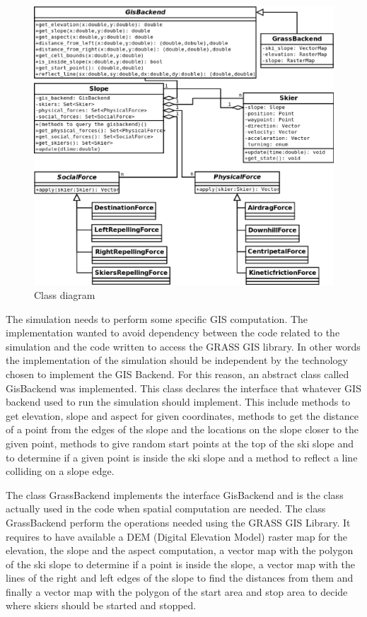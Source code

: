 \documentclass[12pt,a4paper,twoside]{book}
\begin{document}
\begin{figure}[!ht]
  \begin{center}
    \includegraphics[width=\textwidth]{images/Class_diagram.eps}
    \caption{Class diagram}\label{class_diagram}
  \end{center}
\end{figure}

The simulation needs to perform some specific GIS computation. The implementation wanted to avoid dependency between the code related to the simulation and the code written to access the GRASS GIS library. In other words the implementation of the simulation should be independent by the technology chosen to implement the GIS Backend. For this reason, an abstract class called GisBackend was implemented. This class declares the interface that whatever GIS backend used to run the simulation should implement. This include methods to get elevation, slope and aspect for given coordinates, methods to get the distance of a point from the edges of the slope and the locations on the slope closer to the given point, methods to give random start points at the top of the ski slope and to determine if a given point is inside the ski slope and a method to reflect a line colliding on a slope edge.

The class GrassBackend implements the interface GisBackend and is the class actually used in the code when spatial computation are needed. The class GrassBackend perform the operations needed using the GRASS GIS Library. It requires to have available a DEM (Digital Elevation Model) raster map for the elevation, the slope and the aspect computation, a vector map with the polygon of the ski slope to determine if a point is inside the slope, a vector map with the lines of the right and left edges of the slope to find the distances from them and finally a vector map with the polygon of the start area and stop area to decide where skiers should be started and stopped.
\end{document}
